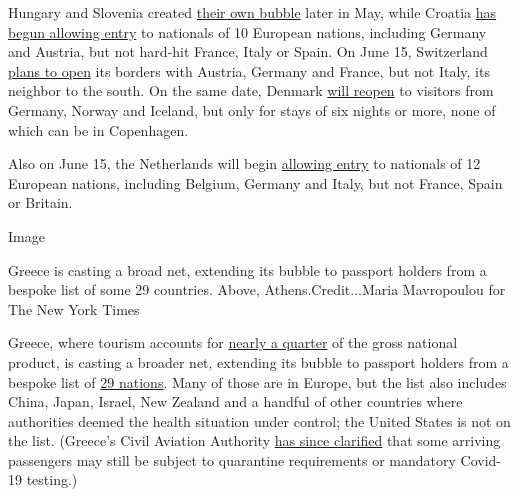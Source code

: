 Hungary and Slovenia created
\href{https://www.reuters.com/article/us-health-coronavirus-hungary-slovenia/hungary-slovenia-allow-travel-by-citizens-between-the-two-countries-idUSKBN234277}{their
own bubble} later in May, while Croatia
\href{https://www.croatiaweek.com/croatia-completely-opens-borders-to-nationals-of-10-countries/}{has
begun allowing entry} to nationals of 10 European nations, including
Germany and Austria, but not hard-hit France, Italy or Spain. On June
15, Switzerland
\href{https://www.sem.admin.ch/sem/en/home/aktuell/news/2020/ref_2020-05-27.html}{plans
to open} its borders with Austria, Germany and France, but not Italy,
its neighbor to the south. On the same date, Denmark
\href{https://www.reuters.com/article/us-health-coronavirus-nordics/sweden-excluded-as-neighbours-denmark-and-norway-ease-travel-restrictions-idUSKBN2351MS}{will
reopen} to visitors from Germany, Norway and Iceland, but only for stays
of six nights or more, none of which can be in Copenhagen.

Also on June 15, the Netherlands will begin
\href{https://www.schengenvisainfo.com/news/netherlands-opens-for-tourists-from-12-eu-countries-from-june-15-britons-not-included/}{allowing
entry} to nationals of 12 European nations, including Belgium, Germany
and Italy, but not France, Spain or Britain.

Image

Greece is casting a broad net, extending its bubble to passport holders
from a bespoke list of some 29 countries. Above, Athens.Credit...Maria
Mavropoulou for The New York Times

Greece, where tourism accounts for
\href{https://www.ekathimerini.com/241056/article/ekathimerini/business/greece-is-over-reliant-on-tourism}{nearly
a quarter} of the gross national product, is casting a broader net,
extending its bubble to passport holders from a bespoke list of
\href{https://in.reuters.com/article/health-coronavirus-greece-tourism/greece-to-open-to-tourists-from-29-countries-from-june-15-idINL8N2DB3R4}{29
nations}. Many of those are in Europe, but the list also includes China,
Japan, Israel, New Zealand and a handful of other countries where
authorities deemed the health situation under control; the United States
is not on the list. (Greece's Civil Aviation Authority
\href{http://www.ypa.gr/news/notams-parateinetai-kai-ton-ioynio-h-ypoxrewtikh-prolhptikh-karantina-twn-tajidiwtwn-poy-eiserxontai-sthn-ellada}{has
since clarified} that some arriving passengers may still be subject to
quarantine requirements or mandatory Covid-19 testing.)

